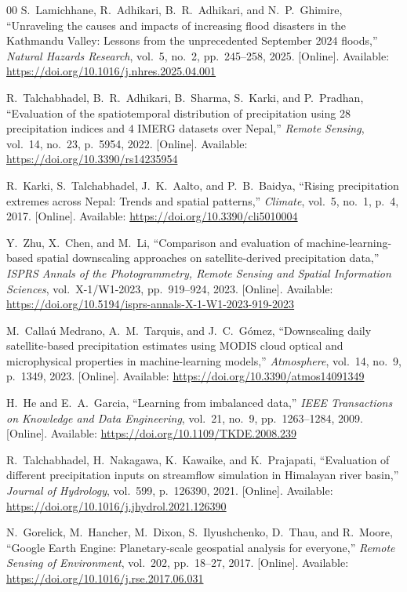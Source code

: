 \documentclass[conference]{IEEEtran}
\begin{document}
\begin{thebibliography}{00}
S.~Lamichhane, R.~Adhikari, B.~R.~Adhikari, and N.~P.~Ghimire, ``Unraveling the causes and impacts of increasing flood disasters in the Kathmandu Valley: Lessons from the unprecedented September 2024 floods,'' \emph{Natural Hazards Research}, vol.~5, no.~2, pp.~245--258, 2025. [Online]. Available: \url{https://doi.org/10.1016/j.nhres.2025.04.001}

R.~Talchabhadel, B.~R.~Adhikari, B.~Sharma, S.~Karki, and P.~Pradhan, ``Evaluation of the spatiotemporal distribution of precipitation using 28 precipitation indices and 4 IMERG datasets over Nepal,'' \emph{Remote Sensing}, vol.~14, no.~23, p.~5954, 2022. [Online]. Available: \url{https://doi.org/10.3390/rs14235954}

R.~Karki, S.~Talchabhadel, J.~K.~Aalto, and P.~B.~Baidya, ``Rising precipitation extremes across Nepal: Trends and spatial patterns,'' \emph{Climate}, vol.~5, no.~1, p.~4, 2017. [Online]. Available: \url{https://doi.org/10.3390/cli5010004}

Y.~Zhu, X.~Chen, and M.~Li, ``Comparison and evaluation of machine-learning-based spatial downscaling approaches on satellite-derived precipitation data,'' \emph{ISPRS Annals of the Photogrammetry, Remote Sensing and Spatial Information Sciences}, vol.~X-1/W1-2023, pp.~919--924, 2023. [Online]. Available: \url{https://doi.org/10.5194/isprs-annals-X-1-W1-2023-919-2023}

M.~Calla{\'u} Medrano, A.~M.~Tarquis, and J.~C.~G{\'o}mez, ``Downscaling daily satellite-based precipitation estimates using MODIS cloud optical and microphysical properties in machine-learning models,'' \emph{Atmosphere}, vol.~14, no.~9, p.~1349, 2023. [Online]. Available: \url{https://doi.org/10.3390/atmos14091349}

H.~He and E.~A.~Garcia, ``Learning from imbalanced data,'' \emph{IEEE Transactions on Knowledge and Data Engineering}, vol.~21, no.~9, pp.~1263--1284, 2009. [Online]. Available: \url{https://doi.org/10.1109/TKDE.2008.239}

R.~Talchabhadel, H.~Nakagawa, K.~Kawaike, and K.~Prajapati, ``Evaluation of different precipitation inputs on streamflow simulation in Himalayan river basin,'' \emph{Journal of Hydrology}, vol.~599, p.~126390, 2021. [Online]. Available: \url{https://doi.org/10.1016/j.jhydrol.2021.126390}

N.~Gorelick, M.~Hancher, M.~Dixon, S.~Ilyushchenko, D.~Thau, and R.~Moore, ``Google Earth Engine: Planetary-scale geospatial analysis for everyone,'' \emph{Remote Sensing of Environment}, vol.~202, pp.~18--27, 2017. [Online]. Available: \url{https://doi.org/10.1016/j.rse.2017.06.031}


\end{thebibliography}
\end{document}
